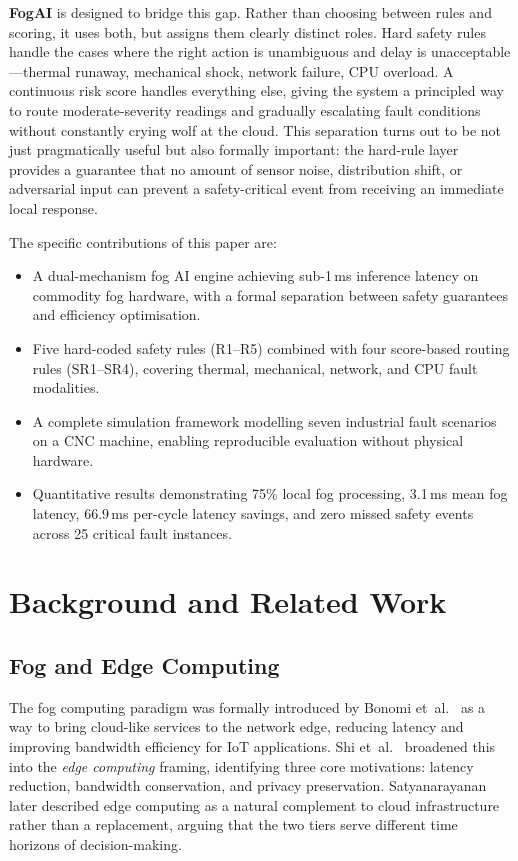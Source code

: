 \documentclass[conference]{IEEEtran}
\begin{document}
\textbf{FogAI} is designed to bridge this gap.
Rather than choosing between rules and scoring, it uses both, but
assigns them clearly distinct roles.
Hard safety rules handle the cases where the right action is
unambiguous and delay is unacceptable---thermal runaway, mechanical
shock, network failure, CPU overload.
A continuous risk score handles everything else, giving the system a
principled way to route moderate-severity readings and gradually
escalating fault conditions without constantly crying wolf at the
cloud.
This separation turns out to be not just pragmatically useful but also
formally important: the hard-rule layer provides a guarantee that no
amount of sensor noise, distribution shift, or adversarial input can
prevent a safety-critical event from receiving an immediate local
response.

The specific contributions of this paper are:
\begin{itemize}
\item A dual-mechanism fog AI engine achieving sub-1\,ms inference
  latency on commodity fog hardware, with a formal separation between
  safety guarantees and efficiency optimisation.
\item Five hard-coded safety rules (R1--R5) combined with four
  score-based routing rules (SR1--SR4), covering thermal, mechanical,
  network, and CPU fault modalities.
\item A complete simulation framework modelling seven industrial fault
  scenarios on a CNC machine, enabling reproducible evaluation without
  physical hardware.
\item Quantitative results demonstrating 75\% local fog processing,
  3.1\,ms mean fog latency, 66.9\,ms per-cycle latency savings, and
  zero missed safety events across 25 critical fault instances.
\end{itemize}


\section{Background and Related Work}

\subsection{Fog and Edge Computing}

The fog computing paradigm was formally introduced by Bonomi
et~al.~\cite{bonomi2012fog} as a way to bring cloud-like services to
the network edge, reducing latency and improving bandwidth efficiency
for IoT applications.
Shi et~al.~\cite{shi2016edge} broadened this into the \emph{edge
computing} framing, identifying three core motivations: latency
reduction, bandwidth conservation, and privacy preservation.
Satyanarayanan~\cite{satyanarayanan2017} later described edge computing
as a natural complement to cloud infrastructure rather than a
replacement, arguing that the two tiers serve different time horizons
of decision-making.
\end{document}
